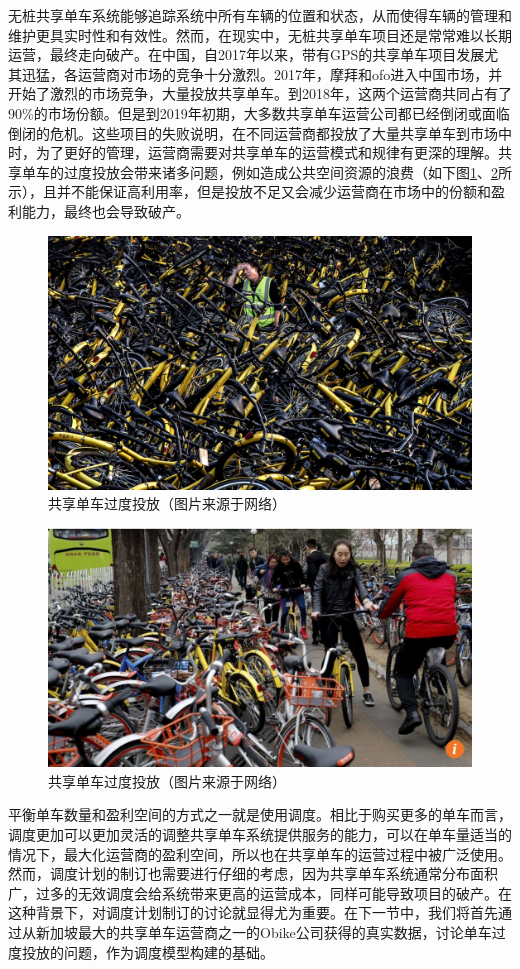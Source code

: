 \documentclass[]{tongjithesis}
\numberwithin{equation}{chapter}
\begin{document}
无桩共享单车系统能够追踪系统中所有车辆的位置和状态，从而使得车辆的管理和维护更具实时性和有效性。然而，在现实中，无桩共享单车项目还是常常难以长期运营，最终走向破产。在中国，自2017年以来，带有GPS的共享单车项目发展尤其迅猛，各运营商对市场的竞争十分激烈。2017年，摩拜和ofo进入中国市场，并开始了激烈的市场竞争，大量投放共享单车。到2018年，这两个运营商共同占有了90\%的市场份额。但是到2019年初期，大多数共享单车运营公司都已经倒闭或面临倒闭的危机。这些项目的失败说明，在不同运营商都投放了大量共享单车到市场中时，为了更好的管理，运营商需要对共享单车的运营模式和规律有更深的理解。共享单车的过度投放会带来诸多问题，例如造成公共空间资源的浪费（如下图\ref{waste1}、\ref{waste2}所示），且并不能保证高利用率，但是投放不足又会减少运营商在市场中的份额和盈利能力，最终也会导致破产。
\begin{figure}[H]
	\centering
	\includegraphics[width= 0.7 \textwidth]{figures_main/waste.jpg}
	\caption{共享单车过度投放（图片来源于网络）}
	\label{waste1}
\end{figure}

\begin{figure}[H]
	\centering
	\includegraphics[width= 0.7 \textwidth]{figures_main/waste1.jpg}
	\caption{共享单车过度投放（图片来源于网络）}
	\label{waste2}
\end{figure}

平衡单车数量和盈利空间的方式之一就是使用调度。相比于购买更多的单车而言，调度更加可以更加灵活的调整共享单车系统提供服务的能力，可以在单车量适当的情况下，最大化运营商的盈利空间，所以也在共享单车的运营过程中被广泛使用。然而，调度计划的制订也需要进行仔细的考虑，因为共享单车系统通常分布面积广，过多的无效调度会给系统带来更高的运营成本，同样可能导致项目的破产。在这种背景下，对调度计划制订的讨论就显得尤为重要。在下一节中，我们将首先通过从新加坡最大的共享单车运营商之一的Obike公司获得的真实数据，讨论单车过度投放的问题，作为调度模型构建的基础。
\end{document}
